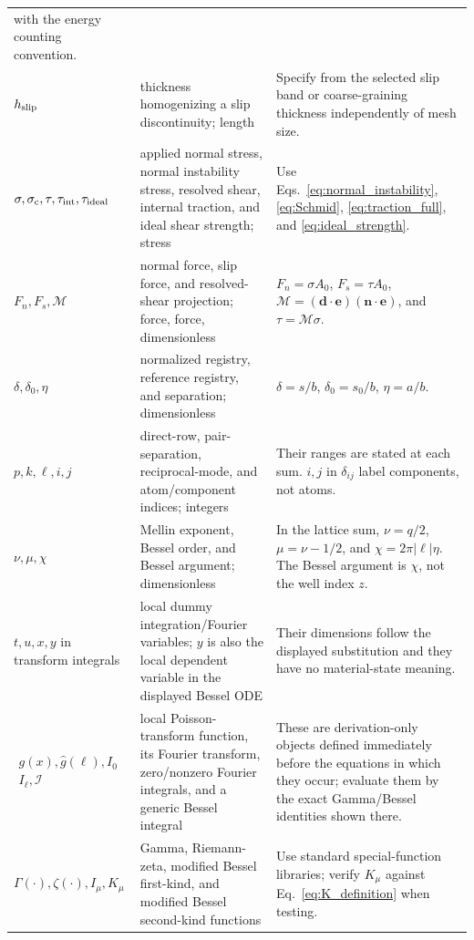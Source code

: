 \begin{longtable}{>{\raggedright\arraybackslash}p{}
                  >{\raggedright\arraybackslash}p{}
                  >{\raggedright\arraybackslash}p{}}
with the energy counting convention.\\
$h_{\rm slip}$ & thickness homogenizing a slip discontinuity; length & Specify from the selected
slip band or coarse-graining thickness independently of mesh size.\\
$\sigma,\sigma_{\rm c},\tau,\tau_{\rm int},\tau_{\rm ideal}$ & applied normal stress, normal
instability stress, resolved shear, internal traction, and ideal shear strength; stress & Use
Eqs.~\eqref{eq:normal_instability}, \eqref{eq:Schmid}, \eqref{eq:traction_full}, and
\eqref{eq:ideal_strength}.\\
$F_n,F_s,\mathcal M$ & normal force, slip force, and resolved-shear projection; force, force,
dimensionless & $F_n=\sigma A_0$, $F_s=\tau A_0$,
$\mathcal M=(\bm d\mathbin{\cdot}\bm e)(\bm n\mathbin{\cdot}\bm e)$, and
$\tau=\mathcal M\sigma$.\\
$\delta,\delta_0,\eta$ & normalized registry, reference registry, and separation; dimensionless &
$\delta=s/b$, $\delta_0=s_0/b$, $\eta=a/b$.\\
$p,k,\ell,i,j$ & direct-row, pair-separation, reciprocal-mode, and atom/component indices; integers
& Their ranges are stated at each sum. $i,j$ in $\delta_{ij}$ label components, not atoms.\\
$\nu,\mu,\chi$ & Mellin exponent, Bessel order, and Bessel argument; dimensionless & In the lattice
sum, $\nu=q/2$, $\mu=\nu-1/2$, and $\chi=2\pi|\ell|\eta$. The Bessel argument is $\chi$, not the
well index $z$.\\
$t,u,x,y$ in transform integrals & local dummy integration/Fourier variables; $y$ is also the
local dependent variable in the displayed Bessel ODE & Their dimensions follow the displayed
substitution and they have no material-state meaning.\\
$\begin{gathered}g(x),\widehat g(\ell),I_0\\I_\ell,\mathcal I\end{gathered}$ & local Poisson-transform function, its Fourier
transform, zero/nonzero Fourier integrals, and a generic Bessel integral & These are derivation-only
objects defined immediately before the equations in which they occur; evaluate them by the exact
Gamma/Bessel identities shown there.\\
$\Gamma(\cdot),\zeta(\cdot),I_\mu,K_\mu$ & Gamma, Riemann-zeta, modified Bessel first-kind, and
modified Bessel second-kind functions & Use standard special-function libraries; verify $K_\mu$
against Eq.~\eqref{eq:K_definition} when testing.\\

\end{longtable}
